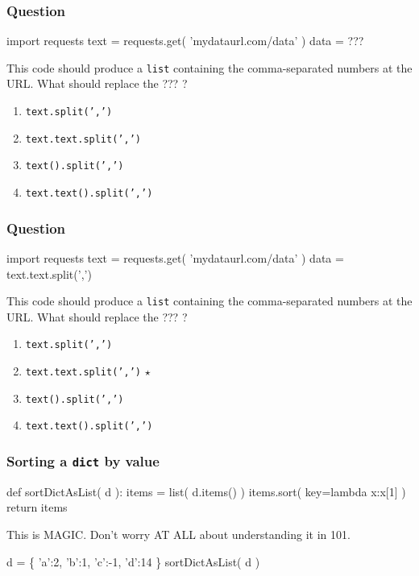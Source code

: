 \documentclass[11pt]{beamer}
\begin{document}
\begin{frame}[fragile]
  \frametitle{Question}
  \Enlarge
  \begin{semiverbatim}
import requests
text = requests.get( 'mydataurl.com/data' )
data = ???
  \end{semiverbatim}
  This code should produce a \texttt{list} containing the comma-separated numbers at the URL.  What should replace the ??? ?
  \begin{enumerate}[label=\Alph*]
  \item  \texttt{text.split(',')}
  \item  \texttt{text.text.split(',')}
  \item  \texttt{text().split(',')}
  \item  \texttt{text.text().split(',')}
  \end{enumerate}
\end{frame}

\begin{frame}[fragile]
  \frametitle{Question}
  \Enlarge
  \begin{semiverbatim}
import requests
text = requests.get( 'mydataurl.com/data' )
data = \textcolor{CS101Alt}{text.text.split(',')}
  \end{semiverbatim}
  This code should produce a \texttt{list} containing the comma-separated numbers at the URL.  What should replace the ??? ?
  \begin{enumerate}[label=\Alph*]
  \item  \texttt{text.split(',')}
  \item  \texttt{text.text.split(',')}  $\star$
  \item  \texttt{text().split(',')}
  \item  \texttt{text.text().split(',')}
  \end{enumerate}
\end{frame}

\begin{frame}[fragile]
  \frametitle{Sorting a \texttt{dict} by value}

  \begin{semiverbatim}
def sortDictAsList( d ):
    items = list( d.items() )
    items.sort( key=lambda x:x[1] )
    return items
  \end{semiverbatim}
  This is MAGIC.  Don't worry AT ALL about understanding it in 101. \\
  \begin{semiverbatim}
d = \{ 'a':2, 'b':1, 'c':-1, 'd':14 \}
sortDictAsList( d )
  \end{semiverbatim}
\end{frame}
\end{document}

